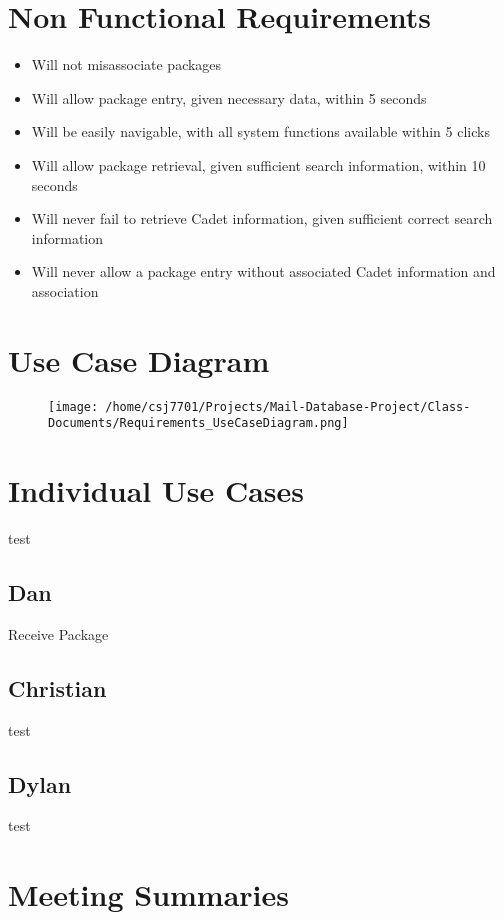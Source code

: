 \documentclass[11pt]{article}
\begin{document}
\section*{Non Functional Requirements}
\label{sec:org2351dff}
\begin{itemize}
\item Will not misassociate packages
\item Will allow package entry, given necessary data, within 5 seconds
\item Will be easily navigable, with all system functions available within 5 clicks
\item Will allow package retrieval, given sufficient search information, within 10 seconds
\item Will never fail to retrieve Cadet information, given sufficient correct search information
\item Will never allow a package entry without associated Cadet information and association
\end{itemize}
\section*{Use Case Diagram}
\label{sec:org5df28f7}

\begin{figure}[htbp]
\centering
\texttt{[image: /home/csj7701/Projects/Mail-Database-Project/Class-Documents/Requirements\_UseCaseDiagram.png]}
\end{figure}
\newpage
\section*{Individual Use Cases}
\label{sec:orgabb011d}
test
\subsection*{Dan}
\label{sec:org5251007}
Receive Package
\subsection*{Christian}
\label{sec:org0ba6888}
test
\subsection*{Dylan}
\label{sec:org7cc8100}
test
\section*{Meeting Summaries}
\label{sec:orged2ca6f}
\end{document}
